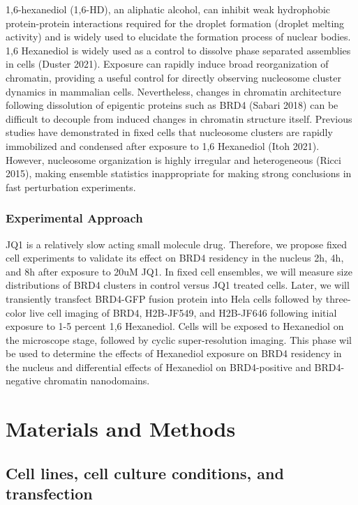 \documentclass{ucetd}
\begin{document}
1,6-hexanediol (1,6-HD), an aliphatic alcohol, can inhibit weak hydrophobic protein-protein interactions required for the droplet formation (droplet melting activity) and is widely used to elucidate the formation process of nuclear bodies. 1,6 Hexanediol is widely used as a control to dissolve phase separated assemblies in cells (Duster 2021). Exposure can rapidly induce broad reorganization of chromatin, providing a useful control for directly observing nucleosome cluster dynamics in mammalian cells. Nevertheless, changes in chromatin architecture following dissolution of epigentic proteins such as BRD4 (Sabari 2018) can be difficult to decouple from induced changes in chromatin structure itself. Previous studies have demonstrated in fixed cells that nucleosome clusters are rapidly immobilized and condensed after exposure to 1,6 Hexanediol (Itoh 2021). However, nucleosome organization is highly irregular and heterogeneous (Ricci 2015), making ensemble statistics inappropriate for making strong conclusions in fast perturbation experiments. 

\subsubsection{Experimental Approach}

JQ1 is a relatively slow acting small molecule drug. Therefore, we propose fixed cell experiments to validate its effect on BRD4 residency in the nucleus 2h, 4h, and 8h after exposure to 20uM JQ1. In fixed cell ensembles, we will measure size distributions of BRD4 clusters in control versus JQ1 treated cells. Later, we will transiently transfect BRD4-GFP fusion protein into Hela cells followed by three-color live cell imaging of BRD4, H2B-JF549, and H2B-JF646 following initial exposure to 1-5 percent 1,6 Hexanediol. Cells will be exposed to Hexanediol on the microscope stage, followed by cyclic super-resolution imaging. This phase wil be used to determine the effects of Hexanediol exposure on BRD4 residency in the nucleus and differential effects of Hexanediol on BRD4-positive and BRD4-negative chromatin nanodomains. 

\section{Materials and Methods}

\subsection{Cell lines, cell culture conditions, and transfection}
\end{document}
